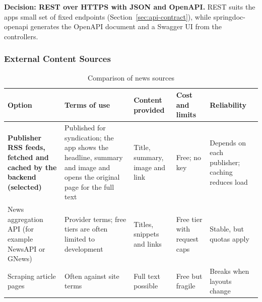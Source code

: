\endgroup

\noindent\textbf{Decision: REST over HTTPS with JSON and OpenAPI.} REST suits the app\textquotesingle s small set of fixed endpoints (Section~\ref{sec:api-contract}), while springdoc-openapi generates the OpenAPI document and a Swagger UI from the controllers.


\subsubsection{External Content Sources}

\begingroup

\footnotesize

\begin{longtable}{|>{\raggedright\arraybackslash}p{3.2cm}|>{\raggedright\arraybackslash}p{2.9cm}|>{\raggedright\arraybackslash}p{2.9cm}|>{\raggedright\arraybackslash}p{2.7cm}|>{\raggedright\arraybackslash}p{2.7cm}|}

\caption{Comparison of news sources}\label{tab:tech-news}\\

\hline

\textbf{Option} & \textbf{Terms of use} & \textbf{Content provided} & \textbf{Cost and limits} & \textbf{Reliability} \\ \hline

\textbf{Publisher RSS feeds, fetched and cached by the backend (selected)} & Published for syndication; the app shows the headline, summary and image and opens the original page for the full text &

Title, summary, image and link &

Free; no key &

Depends on each publisher; caching reduces load \\ \hline

News aggregation API (for example NewsAPI or GNews) & Provider terms; free tiers are often limited to development &

Titles, snippets and links &

Free tier with request caps &

Stable, but quotas apply \\ \hline

Scraping article pages & Often against site terms &

Full text possible &

Free but fragile &

Breaks when layouts change \\ \hline

\end{longtable}

